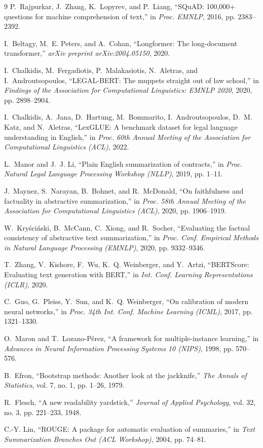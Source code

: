 \documentclass[12pt, a4paper, oneside]{report}
\begin{document}
\begin{thebibliography}{9}
P.~Rajpurkar, J.~Zhang, K.~Lopyrev, and P.~Liang,
``SQuAD: 100,000+ questions for machine comprehension of text,''
in \emph{Proc. EMNLP}, 2016, pp. 2383--2392.

I.~Beltagy, M.~E. Peters, and A.~Cohan,
``Longformer: The long-document transformer,''
\emph{arXiv preprint arXiv:2004.05150}, 2020.

I.~Chalkidis, M.~Fergadiotis, P.~Malakasiotis, N.~Aletras, and I.~Androutsopoulos,
``LEGAL-BERT: The muppets straight out of law school,''
in \emph{Findings of the Association for Computational Linguistics: EMNLP 2020}, 2020, pp. 2898--2904.

I.~Chalkidis, A.~Jana, D.~Hartung, M.~Bommarito, I.~Androutsopoulos, D.~M. Katz, and N.~Aletras,
``LexGLUE: A benchmark dataset for legal language understanding in English,''
in \emph{Proc. 60th Annual Meeting of the Association for Computational Linguistics (ACL)}, 2022.

L.~Manor and J.~J. Li,
``Plain English summarization of contracts,''
in \emph{Proc. Natural Legal Language Processing Workshop (NLLP)}, 2019, pp. 1--11.

J.~Maynez, S.~Narayan, B.~Bohnet, and R.~McDonald,
``On faithfulness and factuality in abstractive summarization,''
in \emph{Proc. 58th Annual Meeting of the Association for Computational Linguistics (ACL)}, 2020, pp. 1906--1919.

W.~Kry\'{s}ci\'{n}ski, B.~McCann, C.~Xiong, and R.~Socher,
``Evaluating the factual consistency of abstractive text summarization,''
in \emph{Proc. Conf. Empirical Methods in Natural Language Processing (EMNLP)}, 2020, pp. 9332--9346.

T.~Zhang, V.~Kishore, F.~Wu, K.~Q. Weinberger, and Y.~Artzi,
``BERTScore: Evaluating text generation with BERT,''
in \emph{Int. Conf. Learning Representations (ICLR)}, 2020.

C.~Guo, G.~Pleiss, Y.~Sun, and K.~Q. Weinberger,
``On calibration of modern neural networks,''
in \emph{Proc. 34th Int. Conf. Machine Learning (ICML)}, 2017, pp. 1321--1330.

O.~Maron and T.~Lozano-P\'{e}rez,
``A framework for multiple-instance learning,''
in \emph{Advances in Neural Information Processing Systems 10 (NIPS)}, 1998, pp. 570--576.

B.~Efron,
``Bootstrap methods: Another look at the jackknife,''
\emph{The Annals of Statistics}, vol. 7, no. 1, pp. 1--26, 1979.

R.~Flesch,
``A new readability yardstick,''
\emph{Journal of Applied Psychology}, vol. 32, no. 3, pp. 221--233, 1948.

C.-Y. Lin,
``ROUGE: A package for automatic evaluation of summaries,''
in \emph{Text Summarization Branches Out (ACL Workshop)}, 2004, pp. 74--81.

\end{thebibliography}
\end{document}
